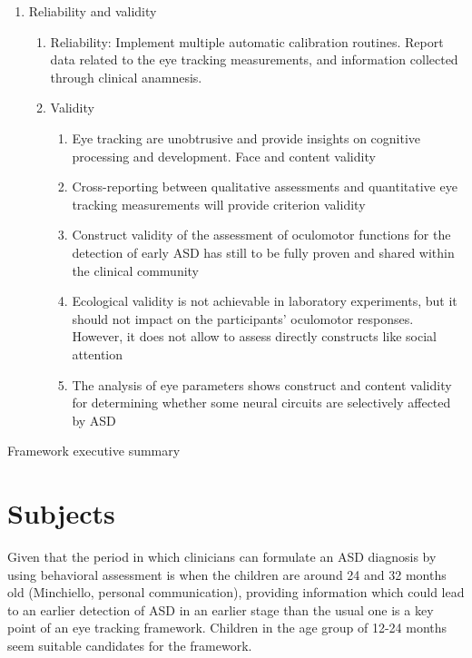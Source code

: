 \begin{table}[tbp]
{{\begin{small}
\begin{enumerate}
\begin{enumerate}[label*=\alph*.]
        \end{enumerate}
        \item Reliability and validity
        \begin{enumerate}[label*=\alph*.]
            \item Reliability: Implement multiple automatic calibration routines. Report data related to the eye tracking measurements, and information collected through clinical anamnesis.
            \item Validity
            \begin{enumerate}[label*=\roman*.]
                    \item Eye tracking are unobtrusive and provide insights on cognitive processing and development. Face and content validity
                    \item Cross-reporting between qualitative assessments and quantitative eye tracking measurements will provide criterion validity
                    \item Construct validity of the assessment of oculomotor functions for the detection of early ASD has still to be fully proven and shared within the clinical community
                    \item Ecological validity is not achievable in laboratory experiments, but it should not impact on the participants’ oculomotor responses. However, it does not allow to assess directly constructs like social attention
                    \item The analysis of eye parameters shows construct and content validity for determining whether some neural circuits are selectively affected by ASD
            \end{enumerate}
        \end{enumerate}        
    \end{enumerate}
\end{small}}}
\newline
\caption{Framework executive summary}
 \label{tab:frameworksummary}
\end{table}


\section{Subjects}
\label{sec:fwksubjects}

Given that the period in which clinicians can formulate an ASD diagnosis by using behavioral assessment is when the children are around 24 and 32 months old (Minchiello, personal communication), providing information which could lead to an earlier detection of ASD in an earlier stage than the usual one is a key point of an eye tracking framework. Children in the age group of 12-24 months seem suitable candidates for the framework.

